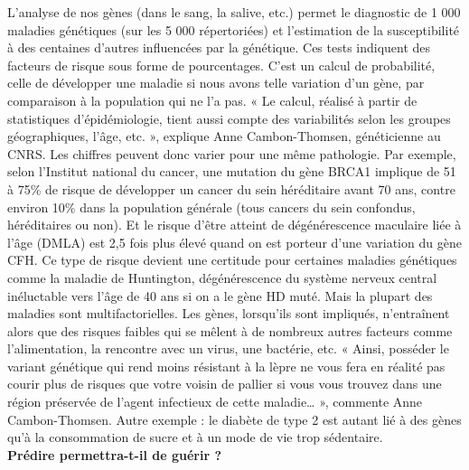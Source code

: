 \documentclass[8pt]{article}
\begin{document}
L’analyse de nos gènes (dans le sang, la salive, etc.) permet le diagnostic de 1 000 maladies génétiques (sur les 5 000 répertoriées) et l’estimation de la susceptibilité à des centaines d’autres influencées par la génétique. Ces tests indiquent des facteurs de risque sous forme de pourcentages. C’est un calcul de probabilité, celle de développer une maladie si nous avons telle variation d’un gène, par comparaison à la population qui ne l’a pas. « Le calcul, réalisé à partir de statistiques d’épidémiologie, tient aussi compte des variabilités selon les groupes géographiques, l’âge, etc. », explique Anne Cambon-Thomsen, généticienne au CNRS. Les chiffres peuvent donc varier pour une même pathologie. Par exemple, selon l’Institut national du cancer, une mutation du gène BRCA1 implique de 51 à 75\% de risque de développer un cancer du sein héréditaire avant 70 ans, contre environ 10\% dans la population générale (tous cancers du sein confondus, héréditaires ou non). Et le risque d’être atteint de dégénérescence maculaire liée à l’âge (DMLA) est 2,5 fois plus élevé quand on est porteur d’une variation du gène CFH. Ce type de risque devient une certitude pour certaines maladies génétiques comme la maladie de Huntington, dégénérescence du système nerveux central inéluctable vers l’âge de 40 ans si on a le gène HD muté. Mais la plupart des maladies sont multifactorielles. Les gènes, lorsqu’ils sont impliqués, n’entraînent alors que des risques faibles qui se mêlent à de nombreux autres facteurs comme l’alimentation, la rencontre avec un virus, une bactérie, etc. « Ainsi, posséder le variant génétique qui rend moins résistant à la lèpre ne vous fera en réalité pas courir plus de risques que votre voisin de pallier si vous vous trouvez dans une région préservée de l’agent infectieux de cette maladie… », commente Anne Cambon-Thomsen. Autre exemple : le diabète de type 2 est autant lié à des gènes qu’à la consommation de sucre et à un mode de vie trop sédentaire. \\

\textbf{Prédire permettra-t-il de guérir ?}
\end{document}
